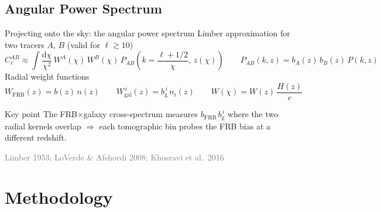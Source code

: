 \documentclass[aspectratio=1610, 10pt]{beamer}
\newcommand{\source}[1]{{\par\hfill\tiny\textcolor{gray}{#1}\par}}
\begin{document}
\subsection{Angular Power Spectrum}
\begin{frame}{Projecting onto the sky: the angular power spectrum}
  Limber approximation for two tracers $A$, $B$ (valid for $\ell \gtrsim 10$)
  \begin{equation*}
    C_{\ell}^{AB} \approx \int \frac{\mathrm{d}\chi}{\chi^2}\, W^{A}(\chi)\, W^{B}(\chi)\,
    P_{AB}\!\left(k = \frac{\ell+1/2}{\chi},\, z(\chi)\right)
    \qquad
    P_{AB}(k, z) = b_A(z)\, b_B(z)\, P(k, z)
  \end{equation*}
  Radial weight functions
  \begin{equation*}
    W_{\mathrm{FRB}}(z) = b(z)\, n(z)
    \qquad
    W_{\mathrm{gal}}^{\,i}(z) = b_{\mathrm{g}}^{\,i}\, n_i(z)
    \qquad
    W(\chi) = W(z)\, \frac{H(z)}{c}
  \end{equation*}
  \begin{block}{Key point}
    The FRB$\times$galaxy cross-spectrum measures $b_{\mathrm{FRB}}\, b_{\mathrm{g}}^{\,i}$ where the two
    radial kernels overlap $\Rightarrow$ each tomographic bin probes the FRB bias at a different redshift.
  \end{block}
  \source{Limber 1953; LoVerde \& Afshordi 2008; Khosravi et al.\ 2016}
\end{frame}

\section{Methodology}
\end{document}
